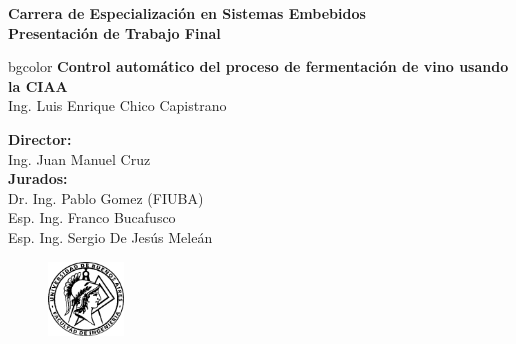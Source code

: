 \documentclass[11pt]{beamer}
\begin{document}
\begin{frame}
  \begin{center}
    \vspace{5px}	
    \large\textbf{Carrera de Especialización en Sistemas Embebidos}\\
    \vspace{5px}
    \Large\textbf{Presentación de Trabajo Final}\\
    \vspace{10px}
    \hspace{-20px}
      \begin{beamercolorbox}[center,dp=2ex,ht=.22\textheight, wd=1\paperwidth]{bgcolor}
        \large\textbf{Control automático del proceso de fermentación de vino usando la CIAA}\\
          \vspace{5px}
        \large{Ing. Luis Enrique Chico Capistrano}
      \end{beamercolorbox}
    \hfill
    \vspace{5px}
    \begin{minipage}[t]{0.6\textwidth}
      \begin{flushleft} \large
        \hspace{-20px}
        \textbf{Director:}\\
        \vspace{5px}
        Ing. Juan Manuel Cruz\\
        \vspace{5px}
        \hspace{-20px}
        \textbf{Jurados:} \\
        \vspace{5px}
        Dr. Ing. Pablo Gomez (FIUBA) \\
        Esp. Ing. Franco Bucafusco\\
        Esp. Ing. Sergio De Jesús Meleán\\
      \end{flushleft}
    \end{minipage}
    \begin{minipage}[t]{0.3\textwidth}
      \vspace{12px}
      \begin{flushright} \large
        \vfill
        \begin{figure}[H]
          \includegraphics[width=2cm]{./imagenes/logo_facu_circle}
        \end{figure}	
      \end{flushright}
    \end{minipage}
      \end{center}
\end{frame}
\end{document}
